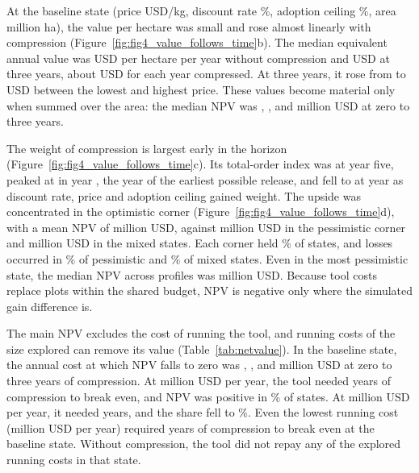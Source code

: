 At the baseline state (price \NumBasePrice USD/kg, discount rate \NumBaseDisc\%, adoption ceiling \NumBaseAdopt\%, area \NumBaseArea million ha), the value per hectare was small and rose almost linearly with compression (Figure~\ref{fig:fig4_value_follows_time}b). The median equivalent annual value was \NumEAAcycZero USD per hectare per year without compression and \NumEAAcycThree USD at three years, about \NumEAAperYearCompressed USD for each year compressed. At three years, it rose from \NumEAAcycThreePriceLow to \NumEAAcycThreePriceHigh USD between the lowest and highest price. These values become material only when summed over the area: the median NPV was \NumNPVcycZero, \NumNPVcycOne, \NumNPVcycTwo and \NumNPVcycThree million USD at zero to three years.

The weight of compression is largest early in the horizon (Figure~\ref{fig:fig4_value_follows_time}c). Its total-order index was \NumDynSTCycYearFive at year five, peaked at \NumDynSTCycPeak in year \NumDynSTCycPeakYear, the year of the earliest possible release, and fell to \NumDynSTCycFinal at year \NumCfgHorizon as discount rate, price and adoption ceiling gained weight. The upside was concentrated in the optimistic corner (Figure~\ref{fig:fig4_value_follows_time}d), with a mean NPV of \NumScnOptimisticMean million USD, against \NumScnPessimisticMean million USD in the pessimistic corner and \NumScnOtherMean million USD in the mixed states. Each corner held \NumScnPessimisticProb\% of states, and losses occurred in \NumScnPessimisticPrNeg\% of pessimistic and \NumScnOtherPrNeg\% of mixed states. Even in the most pessimistic state, the median NPV across profiles was \NumStressMedianNPV million USD. Because tool costs replace plots within the shared budget, NPV is negative only where the simulated gain difference is.

The main NPV excludes the cost of running the tool, and running costs of the size explored can remove its value (Table~\ref{tab:netvalue}). In the baseline state, the annual cost at which NPV falls to zero was \NumBECostCycZero, \NumBECostCycOne, \NumBECostCycTwo and \NumBECostCycThree million USD at zero to three years of compression. At \NumCfgRunCostMid million USD per year, the tool needed \NumBECompCostMid years of compression to break even, and NPV was positive in \NumRvPrPosCostMid\% of states. At \NumCfgRunCostHigh million USD per year, it needed \NumBECompCostHigh years, and the share fell to \NumRvPrPosCostHigh\%. Even the lowest running cost (\NumCfgRunCostLow million USD per year) required \NumBECompCostLow years of compression to break even at the baseline state. Without compression, the tool did not repay any of the explored running costs in that state.

